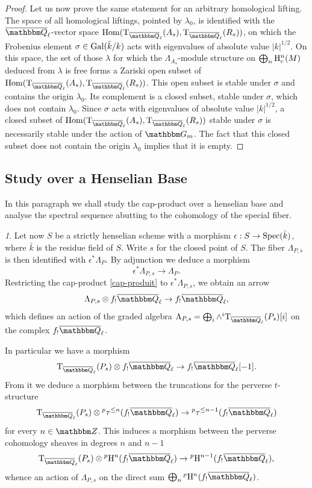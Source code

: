 \documentclass[12pt,english]{smfart}
\numberwithin{equation}{subsection}
\theoremstyle{remark}
\newtheorem{numero}[equation]{}
\newcommand\rmT{{\rm T}}
\newcommand\GG{{\mathbbm G}}
\newcommand\ZZ{{\mathbbm Z}}
\newcommand\QQ{{\mathbbm Q}}
\newcommand\rmH{{\rm H}}
\newcommand\Gal{{\rm Gal}}
\newcommand\Spec{{\rm Spec}}
\newcommand\Ql{{\overline\QQ_\ell}}
\begin{document}
\begin{proof}
Let us now prove the same statement for an arbitrary homological lifting. The space of all homological liftings, pointed by $\lambda_0$, is identified with the $\Ql$-vector space ${\rm Hom}(\rmT_\Ql(A_s),\rmT_\Ql(R_s))$, on which the Frobenius element $\sigma\in\Gal(\bar k/k)$ acts with eigenvalues of absolute value $|k|^{1/2}$. On this space, the set of those $\lambda$ for which the $\Lambda_{A_s}$-module structure on $\bigoplus_n \rmH^n_c(M)$ deduced from $\lambda$ is free forms a Zariski open subset of ${\rm Hom}(\rmT_\Ql(A_s),\rmT_\Ql(R_s))$. This open subset is stable under $\sigma$ and contains the origin $\lambda_0$. Its complement is a closed subset, stable under $\sigma$, which does not contain $\lambda_0$. Since $\sigma$ acts with eigenvalues of absolute value $|k|^{1/2}$, a closed subset of ${\rm Hom}(\rmT_\Ql(A_s),\rmT_\Ql(R_s))$ stable under $\sigma$ is necessarily stable under the action of $\GG_m$. The fact that this closed subset does not contain the origin $\lambda_0$ implies that it is empty.
\end{proof}

\subsection{Study over a Henselian Base}\label{subsection : base henselienne}

In this paragraph we shall study the cap-product over a henselian base and analyse the spectral sequence abutting to the cohomology of the special fiber.

\begin{numero}\label{cap-produit henselien}
Let now $S$ be a strictly henselian scheme with a morphism $\epsilon:S\rightarrow \Spec(\bar k)$, where $\bar k$ is the residue field of $S$. Write $s$ for the closed point of $S$. The fiber $\Lambda_{P,s}$ is then identified with $\epsilon^*\Lambda_P$. By adjunction we deduce a morphism
$$\epsilon^*\Lambda_{P,s}\rightarrow \Lambda_P.$$
Restricting the cap-product \ref{cap-produit} to $\epsilon^*\Lambda_{P,s}$, we obtain an arrow
$$\Lambda_{P,s}\otimes f_!\Ql \rightarrow f_!\Ql,$$
which defines an action of the graded algebra $\Lambda_{P,s}=\bigoplus_i \wedge^i\rmT_\Ql(P_s)[i]$ on the complex $f_!\Ql$.

In particular we have a morphism
$$\rmT_\Ql(P_s)\otimes f_!\Ql \rightarrow f_!\Ql[-1].$$
From it we deduce a morphism between the truncations for the perverse $t$-structure
$$\rmT_\Ql(P_s)\otimes {}^p\tau^{\leq n}(f_!\Ql) \rightarrow {}^p\tau^{\leq n-1}(f_!\Ql)$$
for every $n\in\ZZ$. This induces a morphism between the perverse cohomology sheaves in degrees $n$ and $n-1$
$$\rmT_\Ql(P_s)\otimes {}^p\rmH^n(f_!\Ql) \rightarrow {}^p\rmH^{n-1}(f_!\Ql),$$
whence an action of $\Lambda_{P,s}$ on the direct sum $\bigoplus_n {}^p\rmH^n(f_!\Ql)$.
\end{numero}
\end{document}
